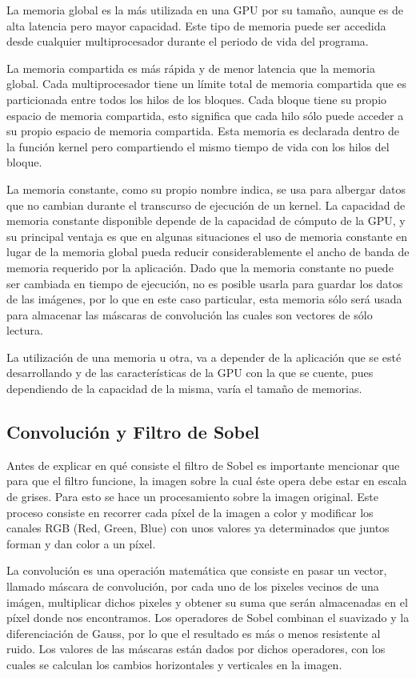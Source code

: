\documentclass[10pt,journal,compsoc]{IEEEtran}
\begin{document}
La memoria global es la más utilizada en una GPU por su tamaño, aunque es de alta latencia pero mayor capacidad. Este tipo de memoria puede ser accedida desde cualquier multiprocesador durante el periodo de vida del programa. 

La memoria compartida es más rápida y de menor latencia que la memoria global. Cada multiprocesador tiene un límite total de memoria compartida que es particionada entre todos los hilos de los bloques. Cada bloque tiene su propio espacio de memoria compartida, esto significa que cada hilo sólo puede acceder a su propio espacio de memoria compartida. Esta memoria es declarada dentro de la función kernel pero compartiendo el mismo tiempo de vida con los hilos del bloque. 

La memoria constante, como su propio nombre indica, se usa para albergar datos que no cambian durante el transcurso de ejecución de un kernel. La capacidad de memoria constante disponible depende de la capacidad de cómputo de la GPU, y su principal ventaja es que en algunas situaciones el uso de memoria constante en lugar de la memoria global pueda reducir considerablemente el ancho de banda de memoria requerido por la aplicación. Dado que la memoria constante no puede ser cambiada en tiempo de ejecución, no es posible usarla para guardar los datos de las imágenes, por lo que en este caso particular, esta memoria sólo será usada para almacenar las máscaras de convolución las cuales son vectores de sólo lectura.

La utilización de una memoria u otra, va a depender de la aplicación que se esté desarrollando y de las características de la GPU con la que se cuente, pues dependiendo de la capacidad de la misma, varía el tamaño de memorias. 


\subsection{Convolución y Filtro de Sobel}

Antes de explicar en qué consiste el filtro de Sobel es importante mencionar que para que el filtro funcione, la imagen sobre la cual éste opera debe estar en escala de grises. Para esto se hace un procesamiento sobre la imagen original. Este proceso consiste en recorrer cada píxel de la imagen a color y modificar los canales RGB (Red, Green, Blue) con unos valores ya determinados\cite{gray} que juntos forman y dan color a un píxel. 

La convolución es una operación matemática que consiste en pasar un vector, llamado máscara de convolución, por cada uno de los pixeles vecinos de una imágen, multiplicar dichos pixeles y obtener su suma que serán almacenadas en el píxel donde nos encontramos.  Los operadores de Sobel combinan el suavizado y la diferenciación de Gauss, por lo que el resultado es más o menos resistente al ruido. Los valores de las máscaras están dados por dichos operadores, con los cuales se calculan los cambios horizontales y verticales en la imagen\cite{sobel}.
\end{document}
